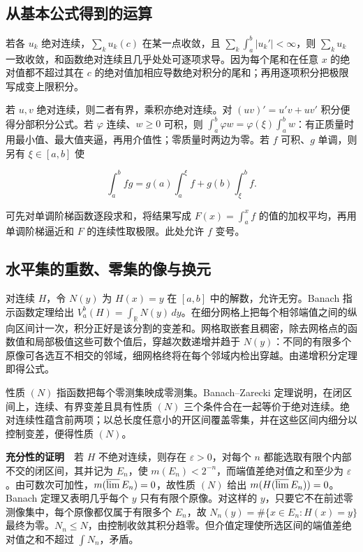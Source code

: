 \documentclass[11pt,a4paper]{article}
\begin{document}
\subsection*{从基本公式得到的运算}\label{ux4eceux57faux672cux516cux5f0fux5f97ux5230ux7684ux8fd0ux7b97}

若各 \(u_k\) 绝对连续，\(\sum_k u_k(c)\) 在某一点收敛，且 \(\sum_k\int_a^b|u_k'|<\infty\)，则 \(\sum_k u_k\) 一致收敛，和函数绝对连续且几乎处处可逐项求导。因为每个尾和在任意 \(x\) 的绝对值都不超过其在 \(c\) 的绝对值加相应导数绝对积分的尾和；再用逐项积分把极限写成变上限积分。

若 \(u,v\) 绝对连续，则二者有界，乘积亦绝对连续。对 \((uv)'=u'v+uv'\) 积分便得分部积分公式。若 \(\varphi\) 连续、\(w\ge0\) 可积，则 \(\int_a^b\varphi w=\varphi(\xi)\int_a^b w\)：有正质量时用最小值、最大值夹逼，再用介值性；零质量时两边为零。若 \(f\) 可积、\(g\) 单调，则另有 \(\xi\in[a,b]\) 使

\[
\int_a^b fg=g(a)\int_a^\xi f+g(b)\int_\xi^b f .
\]

可先对单调阶梯函数逐段求和，将结果写成 \(F(x)=\int_a^x f\) 的值的加权平均，再用单调阶梯逼近和 \(F\) 的连续性取极限。此处允许 \(f\) 变号。

\subsection*{水平集的重数、零集的像与换元}\label{ux6c34ux5e73ux96c6ux7684ux91cdux6570ux96f6ux96c6ux7684ux50cfux4e0eux6362ux5143}

对连续 \(H\)，令 \(N(y)\) 为 \(H(x)=y\) 在 \([a,b]\) 中的解数，允许无穷。Banach 指示函数定理给出 \(V_a^b(H)=\int_{\mathbb R}N(y)\,dy\)。在细分网格上把每个相邻端值之间的纵向区间计一次，积分正好是该分割的变差和。网格取嵌套且稠密，除去网格点的函数值和局部极值这些可数个值后，穿越次数递增并趋于 \(N(y)\)：不同的有限多个原像可各选互不相交的邻域，细网格终将在每个邻域内检出穿越。由递增积分定理即得公式。

性质 \((N)\) 指函数把每个零测集映成零测集。Banach--Zarecki 定理说明，在闭区间上，连续、有界变差且具有性质 \((N)\) 三个条件合在一起等价于绝对连续。绝对连续性蕴含前两项；以总长度任意小的开区间覆盖零集，并在这些区间内细分以控制变差，便得性质 \((N)\)。

\textbf{充分性的证明}　若 \(H\) 不绝对连续，则存在 \(\varepsilon>0\)，对每个 \(n\) 都能选取有限个内部不交的闭区间，其并记为 \(E_n\)，使 \(m(E_n)<2^{-n}\)，而端值差绝对值之和至少为 \(\varepsilon\)。由可数次可加性，\(m(\varlimsup E_n)=0\)，故性质 \((N)\) 给出 \(m(H(\varlimsup E_n))=0\)。Banach 定理又表明几乎每个 \(y\) 只有有限个原像。对这样的 \(y\)，只要它不在前述零测像集中，每个原像都仅属于有限多个 \(E_n\)，故 \(N_n(y)=\#\{x\in E_n:H(x)=y\}\) 最终为零。\(N_n\le N\)，由控制收敛其积分趋零。但介值定理使所选区间的端值差绝对值之和不超过 \(\int N_n\)，矛盾。
\end{document}
